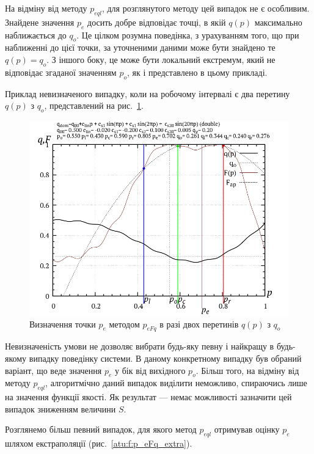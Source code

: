 На відміну від методу
$ p_{eql} $, для розглянутого методу цей випадок не є
особливим. Знайдене значення
$ p_e $ досить добре відповідає точці, в якій
$q(p)$ максимально наближається до
$ q_o $. Це цілком розумна поведінка, з урахуванням того, що при
наближенні до цієї точки, за уточненими даними може бути
знайдено те
$ q (p) = q_o $. З іншого боку, це може бути локальний екстремум, який
не відповідає згаданої значенням
$ p_o $, як і представлено в цьому прикладі.

Приклад невизначеного випадку, коли на робочому інтервалі є
два перетину
$ q (p) $ з
$ q_o $, представлений на рис.~\ref{atu:f:p_eFq_double}.

\begin{figure}[htb!]
  \begin{center}
    \includegraphics[width=60\TW]{p/p_eFq/q_p_eFq_double.png}
  \end{center}
  \caption{Визначення точки $ p_e $ методом $ p_{eFq} $ в разі двох перетинів $ q (p) $ з $ q_o $}
  \label{atu:f:p_eFq_double}
\end{figure}

Невизначеність умови не дозволяє вибрати будь-яку певну і
найкращу в будь-якому випадку поведінку системи. В даному конкретному
випадку був обраний варіант, що веде значення $p_e$ у бік від вихідного
$p_o$. Більш того, на відміну від методу
$ p_{eql} $, алгоритмічно даний випадок виділити неможливо,
спираючись лише на значення функції якості. Як результат ---
немає можливості зазначити цей випадок зниженням величини
$S$.

Розглянемо більш певний випадок, для якого метод
$p_{eql}$ отримував оцінку
$ p_e $ шляхом екстраполяції (рис.~\ref{atu:f:p_eFq_extra}).

